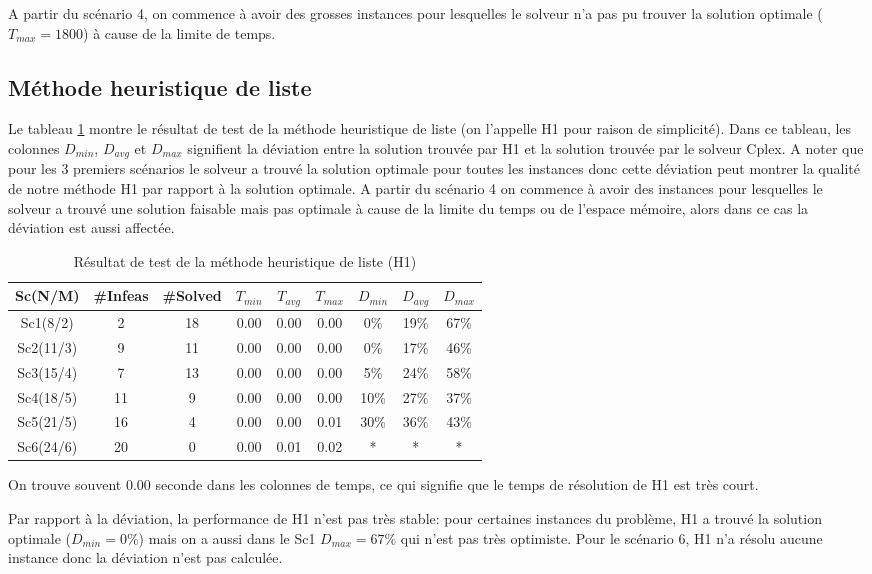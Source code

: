 \documentclass[twoside,fleqn]{EPURapport}
\begin{document}
A partir du scénario 4, on commence à avoir des grosses instances pour lesquelles le solveur n'a pas pu trouver la solution optimale ($T_{max}=1800$) à cause de la limite de temps.

\subsection{Méthode heuristique de liste}
Le tableau \ref{tab_h1} montre le résultat de test de la méthode heuristique de liste (on l'appelle H1 pour raison de simplicité). Dans ce tableau, les colonnes $D_{min}$, $D_{avg}$ et $D_{max}$ signifient la déviation entre la solution trouvée par H1 et la solution trouvée par le solveur Cplex. A noter que pour les 3 premiers scénarios le solveur a trouvé la solution optimale pour toutes les instances donc cette déviation peut montrer la qualité de notre méthode H1 par rapport à la solution optimale. A partir du scénario 4 on commence à avoir des instances pour lesquelles le solveur a trouvé une solution faisable mais pas optimale à cause de la limite du temps ou de l'espace mémoire, alors dans ce cas la déviation est aussi affectée.


\begin{table}[h]
    \centering
    \begin{tabular}{|c|c|c|c|c|c|c|c|c|}
    	\hline
    	Sc(N/M)	& \#Infeas & \#Solved	& $T_{min}$ & $T_{avg}$	& $T_{max}$ & $D_{min}$ & $D_{avg}$	& $D_{max}$ \\ \hline
		Sc1(8/2)  & 2 & 18 & 0.00 & 0.00 & 0.00 &0\% &19\% &67\% \\ \hline
Sc2(11/3) & 9 & 11 & 0.00 & 0.00 & 0.00 &0\% &17\% &46\% \\ \hline
Sc3(15/4) & 7 & 13 & 0.00 & 0.00 & 0.00 &5\% &24\% &58\% \\ \hline
Sc4(18/5) & 11 & 9 & 0.00 & 0.00 & 0.00 &10\%& 27\%& 37\% \\ \hline
Sc5(21/5) & 16 & 4 & 0.00 & 0.00 & 0.01 &30\%& 36\%& 43\% \\ \hline
Sc6(24/6) & 20 & 0 & 0.00 & 0.01 & 0.02 & * & * & * \\ \hline
    \end{tabular}
    \label{tab_h1}
    \caption{Résultat de test de la méthode heuristique de liste (H1)}
\end{table}
\bigskip

On trouve souvent 0.00 seconde dans les colonnes de temps, ce qui signifie que le temps de résolution de H1 est très court.


Par rapport à la déviation, la performance de H1 n'est pas très stable: pour certaines instances du problème, H1 a trouvé la solution optimale ($D_{min}=0\%$) mais on a aussi dans le Sc1 $D_{max}=67\%$ qui n'est pas très optimiste. Pour le scénario 6, H1 n'a résolu aucune instance donc la déviation n'est pas calculée.
\end{document}
